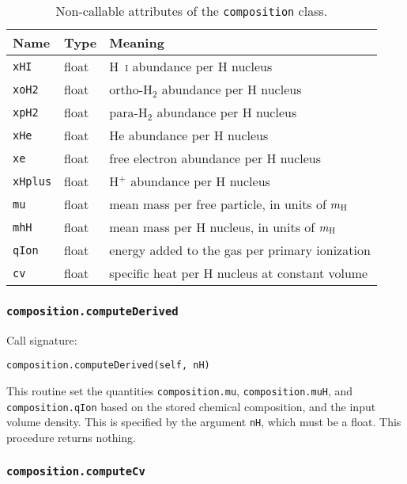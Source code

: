 \documentclass[12pt]{article}
\begin{document}
\begin{table}
\begin{center}
\begin{tabular}{lll}
\hline\hline
Name & Type & Meaning \\
\hline\hline
\texttt{xHI} & float & H~\textsc{i} abundance per H nucleus \\
\texttt{xoH2} & float & ortho-H$_2$ abundance per H nucleus \\
\texttt{xpH2} & float & para-H$_2$ abundance per H nucleus \\
\texttt{xHe} & float & He abundance per H nucleus \\
\texttt{xe} & float & free electron abundance per H nucleus \\
\texttt{xHplus} & float & H$^+$ abundance per H nucleus \\
\texttt{mu} & float & mean mass per free particle, in units of $m_{\rm H}$ \\
\texttt{mhH} & float & mean mass per H nucleus, in units of $m_{\rm H}$ \\
\texttt{qIon} & float & energy added to the gas per primary ionization \\
\texttt{cv} & float & specific heat per H nucleus at constant volume \\
\hline
\end{tabular}
\caption{
\label{tab:comp}
Non-callable attributes of the \texttt{composition} class.
}
\end{center}
\end{table}

\subsubsection{\texttt{composition.computeDerived}}

Call signature:

\begin{verbatim}
composition.computeDerived(self, nH)
\end{verbatim}

This routine set the quantities \verb=composition.mu=, \verb=composition.muH=, and \verb=composition.qIon= based on the stored chemical composition, and the input volume density. This is specified by the argument \verb=nH=, which must be a float. This procedure returns nothing.


\subsubsection{\texttt{composition.computeCv}}
\end{document}
